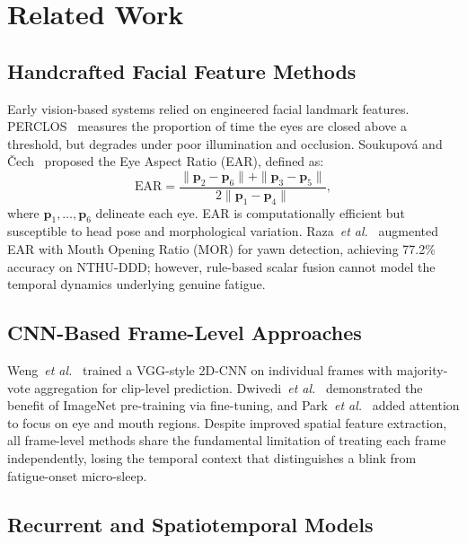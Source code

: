 \documentclass[journal]{IEEEtran}
\begin{document}
\section{Related Work}
\label{sec:related}

\subsection{Handcrafted Facial Feature Methods}
\label{sec:related_handcrafted}

Early vision-based systems relied on engineered facial landmark features. PERCLOS~\cite{dinges1998} measures the proportion of time the eyes are closed above a threshold, but degrades under poor illumination and occlusion. Soukupov\'{a} and \v{C}ech~\cite{soukupova2016} proposed the Eye Aspect Ratio (EAR), defined as:
\begin{equation}
\text{EAR} = \frac{\|\mathbf{p}_2 - \mathbf{p}_6\| + \|\mathbf{p}_3 - \mathbf{p}_5\|}{2\|\mathbf{p}_1 - \mathbf{p}_4\|},
\label{eq:ear}
\end{equation}
where $\mathbf{p}_1, \ldots, \mathbf{p}_6$ delineate each eye. EAR is computationally efficient but susceptible to head pose and morphological variation. Raza~\textit{et al.}~\cite{raza2021} augmented EAR with Mouth Opening Ratio (MOR) for yawn detection, achieving 77.2\% accuracy on NTHU-DDD; however, rule-based scalar fusion cannot model the temporal dynamics underlying genuine fatigue.

\subsection{CNN-Based Frame-Level Approaches}
\label{sec:related_cnn}

Weng~\textit{et al.}~\cite{weng2016} trained a VGG-style 2D-CNN on individual frames with majority-vote aggregation for clip-level prediction. Dwivedi~\textit{et al.}~\cite{dwivedi2014} demonstrated the benefit of ImageNet pre-training via fine-tuning, and Park~\textit{et al.}~\cite{park2016} added attention to focus on eye and mouth regions. Despite improved spatial feature extraction, all frame-level methods share the fundamental limitation of treating each frame independently, losing the temporal context that distinguishes a blink from fatigue-onset micro-sleep.

\subsection{Recurrent and Spatiotemporal Models}
\label{sec:related_spatiotemporal}
\end{document}
